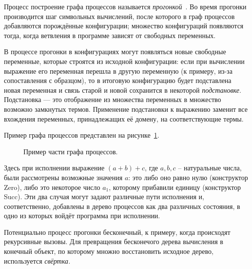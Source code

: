Процесс построение графа процессов называется \emph{прогонкой}~.
Во время прогонки производится шаг символьных вычислений, после которого
в граф процессов добавляются порождённые конфигурации; множество конфигураций
появляются тогда, когда ветвления в программе зависят от свободных переменных.

В процессе прогонки в конфигурациях могут появляться новые свободные переменные,
которые строятся из исходной конфигурации:
если при вычислении выражение его переменная перешла в другую переменную (к примеру, из-за сопоставления с образцом),
то в итоговую конфигурацию будет подставлена новая переменная и связь старой и новой сохранится в
некоторой \emph{подстановке}.
Подстановка --- это отображение из множества переменных в множество возможно замкнутых термов.
Применение подстановки к выражению заменит все вхождения переменных, принадлежащих её домену,
на соответствующие термы. %

Пример графа процессов представлен на рисунке~\ref{fig:pgraphExample}.
\begin{figure}[h!]
\center
{}

\label{fig:pgraphExample}
\caption{Пример части графа процессов.}
\end{figure}
Здесь при исполнении выражение $(a + b) + c$, где $a, b, c$ -- натуральные числа,
были рассмотрены возможные значения $a$: это либо оно равно нулю (конструктор Zero), либо это некоторое
число $a_1$, которому прибавили единицу (конструктор Succ). Эти два случая могут задают
различные пути исполнения и, соответственно, добавлены в дерево процессов как два различных состояния,
в одно из которых войдёт программа при исполнении.


Потенциально процесс прогонки бесконечный, к примеру, когда происходят рекурсивные вызовы.
Для превращения бесконечого дерева вычисления в конечный объект, по которому множно
восстановить исходное дерево, используется \emph{свёртка.}

